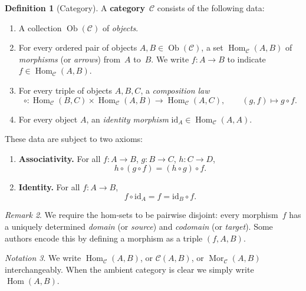 \documentclass[a4paper,12pt]{book}
\DeclareMathOperator{\Hom}{Hom}
\DeclareMathOperator{\Ob}{Ob}
\DeclareMathOperator{\Mor}{Mor}
\newcommand{\id}{\mathrm{id}}
\theoremstyle{definition}
\newtheorem{definition}{Definition}[section]
\theoremstyle{plain}
\theoremstyle{remark}
\newtheorem{remark}[definition]{Remark}
\newtheorem{notation}[definition]{Notation}
\begin{document}
\begin{definition}[Category]\label{def:category}
A \textbf{category}~$\mathcal{C}$ consists of the following data:
\begin{enumerate}[label=(\roman*)]
    \item A collection $\Ob(\mathcal{C})$ of \emph{objects}.
    \item For every ordered pair of objects $A,B\in\Ob(\mathcal{C})$,
          a set $\Hom_\mathcal{C}(A,B)$ of \emph{morphisms}
          (or \emph{arrows}) from~$A$ to~$B$.
          We write $f\colon A\to B$ to indicate
          $f\in\Hom_\mathcal{C}(A,B)$.
    \item For every triple of objects $A,B,C$, a \emph{composition law}
          \[
              \circ\colon \Hom_\mathcal{C}(B,C)\times
                          \Hom_\mathcal{C}(A,B)
                          \longrightarrow \Hom_\mathcal{C}(A,C),
              \qquad (g,f)\longmapsto g\circ f.
          \]
    \item For every object $A$, an \emph{identity morphism}
          $\id_A\in\Hom_\mathcal{C}(A,A)$.
\end{enumerate}
These data are subject to two axioms:
\begin{enumerate}[label=\textbf{(C\arabic*)}]
    \item \textbf{Associativity.}
          For all $f\colon A\to B$, $g\colon B\to C$,
          $h\colon C\to D$,
          \[
              h\circ(g\circ f) = (h\circ g)\circ f.
          \]
    \item \textbf{Identity.}
          For all $f\colon A\to B$,
          \[
              f\circ\id_A = f = \id_B\circ f.
          \]
\end{enumerate}
\end{definition}

\begin{remark}\label{rem:hom-disjoint}
We require the hom-sets to be pairwise disjoint: every morphism~$f$ has a
uniquely determined \emph{domain} (or \emph{source}) and \emph{codomain}
(or \emph{target}).  Some authors encode this by defining a morphism as a
triple $(f,A,B)$.
\end{remark}

\begin{notation}\label{not:hom-notation}
We write $\Hom_\mathcal{C}(A,B)$, or $\mathcal{C}(A,B)$, or
$\Mor_\mathcal{C}(A,B)$ interchangeably.
When the ambient category is clear we simply write $\Hom(A,B)$.
\end{notation}
\end{document}
